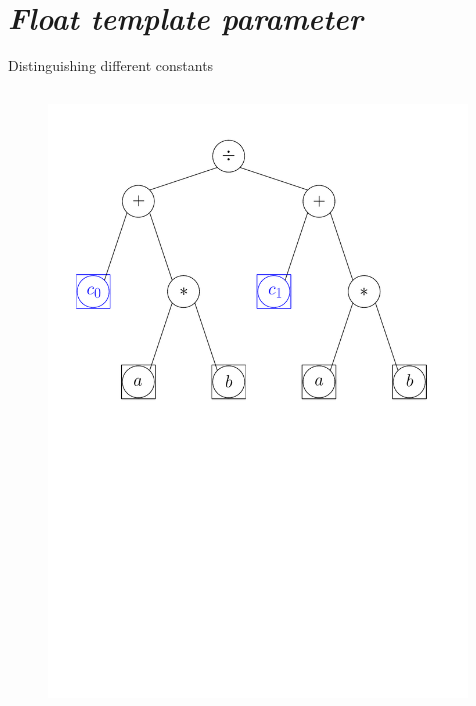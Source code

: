 \documentclass[xcolor=dvipsnames]{beamer}
\begin{document}
\section{\protect\textit{Float template parameter}}

\begin{frame}[fragile]{Distinguishing different constants}
  \begin{columns}[T] %
    \begin{column}{0.75\textwidth}
      \begin{figure}[H]
        \centering
        \includegraphics[width=0.99\textwidth]{fig_exprtree_cb}
      \end{figure}
    \end{column}%
  \end{columns}
\end{frame}
\end{document}
